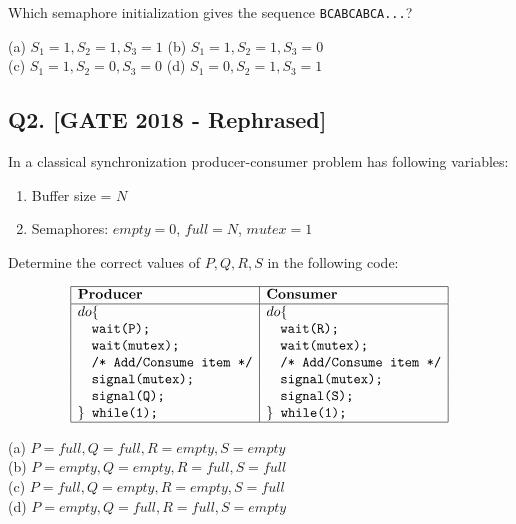 Which semaphore initialization gives the sequence \texttt{BCABCABCA...}?

(a) \(S_1 = 1, S_2 = 1, S_3 = 1\) \quad
(b) \(S_1 = 1, S_2 = 1, S_3 = 0\) \\
(c) \(S_1 = 1, S_2 = 0, S_3 = 0\) \quad
(d) \(S_1 = 0, S_2 = 1, S_3 = 1\)

\vspace{1em}

\subsection*{Q2. [GATE 2018 - Rephrased]}
In a classical synchronization producer-consumer problem has following variables:
\begin{enumerate}
    \item Buffer size = \(N\)
    \item Semaphores: \(empty = 0\), \(full = N\), \(mutex = 1\)
\end{enumerate}

Determine the correct values of \(P, Q, R, S\) in the following code:

\[
\begin{array}{|l|l|}
\hline
\textbf{Producer} & \textbf{Consumer} \\
\hline
\texttt{$do \{$} & \texttt{$do \{$} \\
\quad \texttt{wait(P);} & \quad \texttt{wait(R);} \\
\quad \texttt{wait(mutex);} & \quad \texttt{wait(mutex);} \\
\quad \texttt{/* Add/Consume item */} & \quad \texttt{/* Add/Consume item */} \\
\quad \texttt{signal(mutex);} & \quad \texttt{signal(mutex);} \\
\quad \texttt{signal(Q);} & \quad \texttt{signal(S);} \\
\texttt{$\}$ while(1);} & \texttt{$\}$ while(1);} \\
\hline
\end{array}
\]

(a) \(P = full, Q = full, R = empty, S = empty\) \\
(b) \(P = empty, Q = empty, R = full, S = full\) \\
(c) \(P = full, Q = empty, R = empty, S = full\) \\
(d) \(P = empty, Q = full, R = full, S = empty\)

\vspace{1em}


